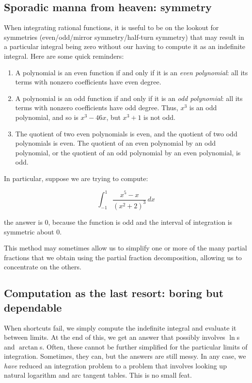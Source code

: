 \documentclass[10pt]{amsart}
\begin{document}
\subsection{Sporadic manna from heaven: symmetry}

When integrating rational functions, it is useful to be on the lookout
for symmetries (even/odd/mirror symmetry/half-turn symmetry) that may
result in a particular integral being zero without our having to
compute it as an indefinite integral. Here are some quick reminders:

\begin{enumerate}
\item A polynomial is an even function if and only if it is an {\em
  even polynomial}: all its terms with nonzero coefficients have even
  degree.
\item A polynomial is an odd function if and only if it is an {\em odd
  polynomial}: all its terms with nonzero coefficients have odd
  degree. Thus, $x^3$ is an odd polynomial, and so is $x^3 - 46 x$,
  but $x^3 + 1$ is not odd.
\item The quotient of two even polynomials is even, and the quotient
  of two odd polynomials is even. The quotient of an even polynomial
  by an odd polynomial, or the quotient of an odd polynomial by an
  even polynomial, is odd.
\end{enumerate}

In particular, suppose we are trying to compute:

$$\int_{-1}^1 \frac{x^5 - x}{(x^2 + 2)^3} \, dx$$

the answer is $0$, because the function is odd and the interval of
integration is symmetric about $0$.

This method may sometimes allow us to simplify one or more of the many
partial fractions that we obtain using the partial fraction
decomposition, allowing us to concentrate on the others.

\subsection{Computation as the last resort: boring but dependable}

When shortcuts fail, we simply compute the indefinite integral and
evaluate it between limits. At the end of this, we get an answer that
possibly involves $\ln$s and $\arctan$s. Often, these cannot be
further simplified for the particular limits of
integration. Sometimes, they can, but the answers are still messy. In
any case, we {\em have} reduced an integration problem to a problem
that involves looking up natural logarithm and arc tangent
tables. This is no small feat.
\end{document}
